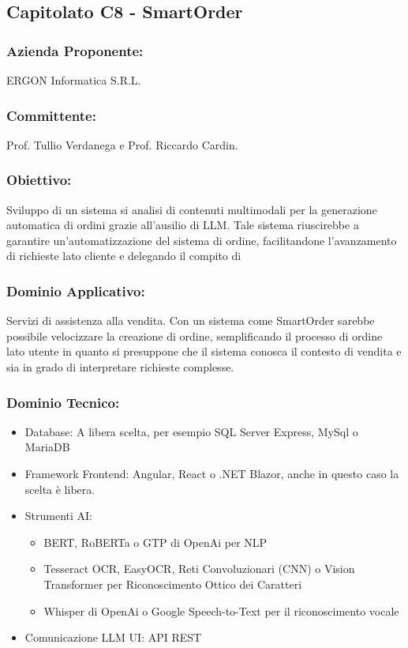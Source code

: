 \documentclass[a4paper,12pt]{article}
\begin{document}
\subsection{ Capitolato C8 - SmartOrder}
\subsubsection*{Azienda Proponente:} ERGON Informatica S.R.L.
\subsubsection*{Committente:} Prof. Tullio Verdanega e Prof. Riccardo Cardin.
\subsubsection*{Obiettivo:} Sviluppo di un sistema si analisi di contenuti multimodali per la generazione automatica di ordini grazie all'ausilio di LLM. Tale sistema riuscirebbe a garantire un'automatizzazione del sistema di ordine, facilitandone l'avanzamento di richieste lato cliente e delegando il compito di 
\subsubsection*{Dominio Applicativo:} Servizi di assistenza alla vendita. Con un sistema come SmartOrder sarebbe possibile velocizzare la creazione di ordine, semplificando il processo di ordine lato utente in quanto si presuppone che il sistema conosca il contesto di vendita e sia in grado di interpretare richieste complesse.
\subsubsection*{Dominio Tecnico:}
\begin{itemize}
    \item Database: A libera scelta, per esempio SQL Server Express, MySql o MariaDB
    \item Framework Frontend: Angular, React o .NET Blazor, anche in questo caso la scelta è libera.
    \item Strumenti AI: \begin{itemize}
                            \item BERT, RoBERTa o GTP di OpenAi per NLP
                            \item Tesseract OCR, EasyOCR, Reti Convoluzionari (CNN) o Vision Transformer per Riconoscimento Ottico dei Caratteri
                            \item Whisper di OpenAi o Google Speech-to-Text per il riconoscimento vocale
                        \end{itemize}
    \item Comunicazione LLM UI: API REST
\end{itemize}
\end{document}
